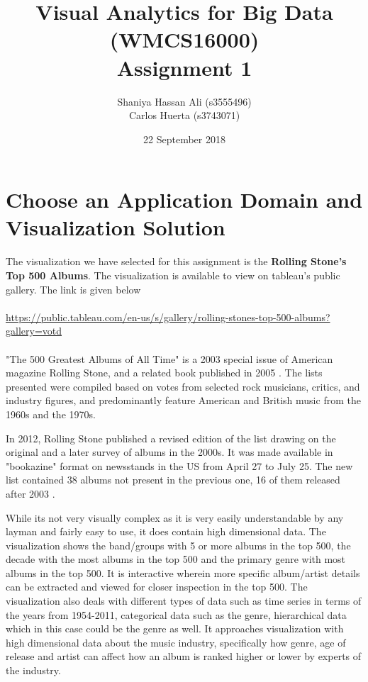 \documentclass{article}
\title{Visual Analytics for Big Data (WMCS16000)\\
\large{Assignment 1}}
\author{Shaniya Hassan Ali (s3555496)
\\Carlos Huerta (s3743071) }
\date{22 September 2018}
\begin{document}
\maketitle

\doublespacing

\section{Choose an Application Domain and Visualization Solution}

The visualization we have selected for this assignment is the \textbf{Rolling Stone's Top 500 Albums}. The visualization is available to view on tableau's public gallery. The link is given below
\\
\\
\url{https://public.tableau.com/en-us/s/gallery/rolling-stones-top-500-albums?gallery=votd} 
\\
\\
"The 500 Greatest Albums of All Time" is a 2003 special issue of American magazine Rolling Stone, and a related book published in 2005 \cite{rstone-wiki}. The lists presented were compiled based on votes from selected rock musicians, critics, and industry figures, and predominantly feature American and British music from the 1960s and the 1970s.

In 2012, Rolling Stone published a revised edition of the list drawing on the original and a later survey of albums in the 2000s. It was made available in "bookazine" format on newsstands in the US from April 27 to July 25. The new list contained 38 albums not present in the previous one, 16 of them released after 2003 \cite{rstone-wiki}.

While its not very visually complex as it is very easily understandable by any layman and fairly easy to use, it does contain high dimensional data. The visualization shows the band/groups with 5 or more albums in the top 500, the decade with the most albums in the top 500 and the primary genre with most albums in the top 500. It is interactive wherein more specific album/artist details can be extracted and viewed for closer inspection in the top 500. The visualization also deals with different types of data such as time series in terms of the years from 1954-2011, categorical data such as the genre, hierarchical data which in this case could be the genre as well. It approaches visualization with high dimensional data about the music industry, specifically how genre, age of release and artist can affect how an album is ranked higher or lower by experts of the industry.
\end{document}
